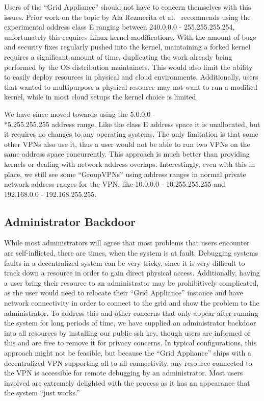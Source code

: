 \documentclass[twocolumn]{svjour3}
\begin{document}
Users of the ``Grid Appliance'' should not have to concern themselves with this
issues.  Prior work on the topic by Ala Rezmerita et al.~\cite{pvc} recommends
using the experimental address class E ranging between 240.0.0.0 -
255.255.255.254, unfortunately this requires Linux kernel modifications.  With
the amount of bugs and security fixes regularly pushed into the kernel,
maintaining a forked kernel requires a significant amount of time, duplicating
the work already being performed by the OS distribution maintainers.  This
would also limit the ability to easily deploy resources in physical and cloud
environments.  Additionally, users that wanted to multipurpose a physical
resource may not want to run a modified kernel, while in most cloud setups the
kernel choice is limited.

We have since moved towards using the 5.0.0.0 - \\*5.255.255.255 address range.
Like the class E address space it is unallocated, but it requires no changes to
any operating systems.  The only limitation is that some other VPNs also use
it, thus a user would not be able to run two VPNs on the same address space
concurrently.  This approach is much better than providing kernels or dealing
with network address overlaps.  Interestingly, even with this in place, we
still see some ``GroupVPNs''  using address ranges in normal private network
address ranges for the VPN, like 10.0.0.0 - 10.255.255.255 and 192.168.0.0 -
192.168.255.255.

\subsection{Administrator Backdoor}

While most administrators will agree that most problems that users encounter
are self-inflicted, there are times, when the system is at fault.  Debugging
systems faults in a decentralized system can be very tricky, since it is very
difficult to track down a resource in order to gain direct physical access.
Additionally, having a user bring their resource to an administrator may be
prohibitively complicated, as the user would need to relocate their ``Grid
Appliance'' instance and have network connectivity in order to connect to the
grid and show the problem to the administrator.  To address this and other
concerns that only appear after running the system for long periods of time, we
have supplied an administrator backdoor into all resources by installing our
public ssh key, though users are informed of this and are free to remove it for
privacy concerns.  In typical configurations, this approach might not be
feasible, but because the ``Grid Appliance'' ships with a decentralized VPN
supporting all-to-all connectivity, any resource connected to the VPN is
accessible for remote debugging by an administrator.  Most users involved are
extremely delighted with the process as it has an appearance that the system
``just works.''
\end{document}
